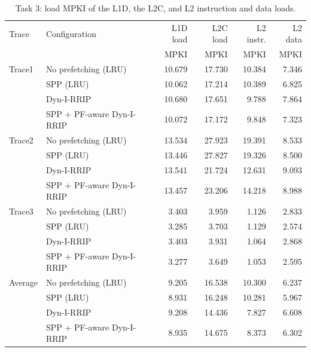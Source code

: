 \documentclass[11pt]{article}
\begin{document}
\begin{table}[H]
\centering
\small
\begin{tabular}{llrrrr}
\toprule
Trace & Configuration & L1D load & L2C load & L2 instr. & L2 data\\
      &               & MPKI     & MPKI     & MPKI      & MPKI\\
\midrule
Trace1 & No prefetching (LRU)      & 10.679 & 17.730 & 10.384 & 7.346\\
       & SPP (LRU)                 & 10.062 & 17.214 & 10.389 & 6.825\\
       & Dyn-I-RRIP                & 10.680 & 17.651 &  9.788 & 7.864\\
       & SPP + PF-aware Dyn-I-RRIP & 10.072 & 17.172 &  9.848 & 7.323\\
\midrule
Trace2 & No prefetching (LRU)      & 13.534 & 27.923 & 19.391 & 8.533\\
       & SPP (LRU)                 & 13.446 & 27.827 & 19.326 & 8.500\\
       & Dyn-I-RRIP                & 13.541 & 21.724 & 12.631 & 9.093\\
       & SPP + PF-aware Dyn-I-RRIP & 13.457 & 23.206 & 14.218 & 8.988\\
\midrule
Trace3 & No prefetching (LRU)      &  3.403 &  3.959 &  1.126 & 2.833\\
       & SPP (LRU)                 &  3.285 &  3.703 &  1.129 & 2.574\\
       & Dyn-I-RRIP                &  3.403 &  3.931 &  1.064 & 2.868\\
       & SPP + PF-aware Dyn-I-RRIP &  3.277 &  3.649 &  1.053 & 2.595\\
\midrule
Average & No prefetching (LRU)      & 9.205 & 16.538 & 10.300 & 6.237\\
        & SPP (LRU)                 & 8.931 & 16.248 & 10.281 & 5.967\\
        & Dyn-I-RRIP                & 9.208 & 14.436 &  7.827 & 6.608\\
        & SPP + PF-aware Dyn-I-RRIP & 8.935 & 14.675 &  8.373 & 6.302\\
\bottomrule
\end{tabular}
\caption{Task 3: load MPKI of the L1D, the L2C, and L2 instruction and data
loads.}
\label{tab:t3-mpki}
\end{table}
\end{document}
